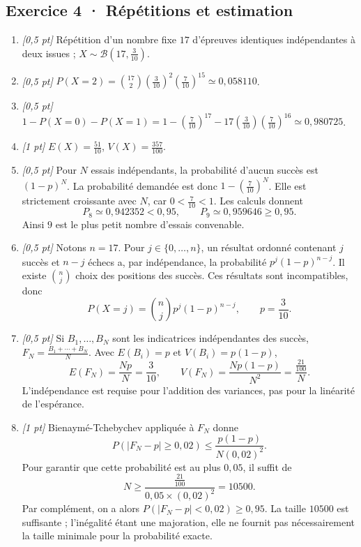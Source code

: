 \subsection*{Exercice 4 · Répétitions et estimation}\begin{enumerate}

\item \textit{[0,5 pt]} Répétition d'un nombre fixe $17$ d'épreuves identiques indépendantes à deux issues ; $X\sim\mathcal B(17,\frac{3}{10})$.

\item \textit{[0,5 pt]} $P(X=2)=\binom{17}2(\frac{3}{10})^2(\frac{7}{10})^{15}\simeq0{,}058110$.

\item \textit{[0,5 pt]} $1-P(X=0)-P(X=1)=1-(\frac{7}{10})^{17}-17(\frac{3}{10})(\frac{7}{10})^{16}\simeq0{,}980725$.

\item \textit{[1 pt]} $E(X)=\frac{51}{10}$, $V(X)=\frac{357}{100}$.

\item \textit{[0,5 pt]} Pour $N$ essais indépendants, la probabilité d'aucun succès est $(1-p)^N$. La probabilité demandée est donc $1-(\frac{7}{10})^N$. Elle est strictement croissante avec $N$, car $0<\frac{7}{10}<1$. Les calculs donnent
\[P_{8}\simeq0{,}942352<0{,}95,\qquad P_{9}\simeq0{,}959646\ge0{,}95.\]
Ainsi $9$ est le plus petit nombre d'essais convenable.

\item \textit{[0,5 pt]} Notons $n=17$. Pour $j\in\{0,\ldots,n\}$, un résultat ordonné contenant $j$ succès et $n-j$ échecs a, par indépendance, la probabilité $p^j(1-p)^{n-j}$. Il existe $\binom nj$ choix des positions des succès. Ces résultats sont incompatibles, donc
\[P(X=j)=\binom nj p^j(1-p)^{n-j},\qquad p=\frac{3}{10}.\]

\item \textit{[0,5 pt]} Si $B_1,\ldots,B_N$ sont les indicatrices indépendantes des succès, $F_N=\frac{B_1+\cdots+B_N}{N}$. Avec $E(B_i)=p$ et $V(B_i)=p(1-p)$,
\[E(F_N)=\frac{Np}{N}=\frac{3}{10},\qquad V(F_N)=\frac{Np(1-p)}{N^2}=\frac{\frac{21}{100}}{N}.\]
L'indépendance est requise pour l'addition des variances, pas pour la linéarité de l'espérance.

\item \textit{[1 pt]} Bienaymé-Tchebychev appliquée à $F_N$ donne
\[P(|F_N-p|\ge0{,}02)\le\frac{p(1-p)}{N(0{,}02)^2}.\]
Pour garantir que cette probabilité est au plus $0{,}05$, il suffit de
\[N\ge\frac{\frac{21}{100}}{0{,}05\times(0{,}02)^2}=10500.\]
Par complément, on a alors $P(|F_N-p|<0{,}02)\ge0{,}95$. La taille $10500$ est suffisante ; l'inégalité étant une majoration, elle ne fournit pas nécessairement la taille minimale pour la probabilité exacte.

\end{enumerate}

